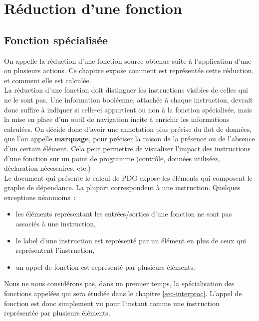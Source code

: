\chapter{Réduction d'une fonction}\label{sec-filtrage-fct}

\section{Fonction spécialisée}

On appelle 
la réduction d'une fonction source obtenue suite à l'application d'une ou
plusieurs actions. Ce chapitre expose comment est représentée
cette réduction, et comment elle est calculée.\\

La réduction d'une fonction doit distinguer les instructions visibles
de celles qui ne le sont pas.
Une information booléenne, attachée à chaque instruction,
devrait donc suffire à
indiquer si celle-ci appartient ou non à la fonction spécialisée, mais
la mise en place d'un outil de navigation incite à enrichir les informations
calculées. On décide donc d'avoir
une annotation plus précise du flot de données, que l'on appelle
{\bf marquage},
pour préciser la raison de la présence ou de l'absence d'un certain élément.
Cela peut permettre de visualiser l'impact des instructions d'une
fonction sur un point de programme (contrôle, données utilisées, déclaration
nécessaires, etc.)\\

Le document qui présente le calcul de PDG expose les éléments qui composent le
graphe de dépendance. La plupart correspondent à une instruction.
Quelques exceptions néanmoins~:
\begin{itemize}
\item les éléments représentant les entrées/sorties d'une fonction
  ne sont pas associés à une instruction,
\item le label d'une instruction est représenté par un élément en plus de ceux
qui représentent l'instruction,
\item un appel de fonction est représenté par plusieurs éléments.\\
\end{itemize}

Nous ne nous considérons pas, dans un premier temps,
la spécialisation des fonctions appelées qui sera étudiée
dans le chapitre \ref{sec-interproc}. 
L'appel de fonction est donc simplement vu pour l'instant comme
une instruction représentée par plusieurs éléments.


